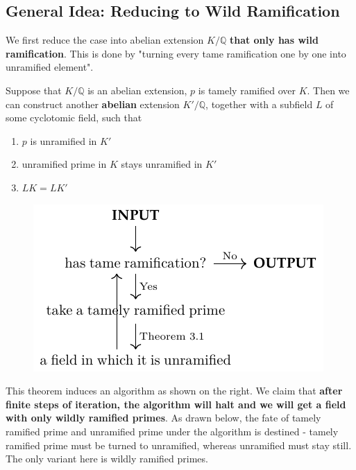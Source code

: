 \subsection{General Idea: Reducing to Wild Ramification}
    We first reduce the case into abelian extension $K/\mathbb{Q}$ \textbf{that only has wild ramification}. This is done by "turning every tame ramification one by one into unramified element".
    \begin{thm}
    \label{thm:thm-31}
    Suppose that $K/\mathbb{Q}$ is an abelian extension, $p$ is tamely ramified over $K$. Then we can construct another \textbf{abelian} extension $K'/\mathbb{Q}$, together with a subfield $L$ of some cyclotomic field, such that
    \begin{enumerate}
        \item $p$ is unramified in $K'$
        \item unramified prime in $K$ stays unramified in $K'$
        \item $LK=LK'$
    \end{enumerate}
    \end{thm}
    \begin{figure}
    \includegraphics[width=\linewidth]{Figures/figure4.pdf}
    \end{figure}
    \noindent
    This theorem induces an algorithm as shown on the right.
    We claim that \textbf{after finite steps of iteration, the algorithm will halt and we will get a field with only wildly ramified primes}. As drawn below, the fate of tamely ramified prime and unramified prime under the algorithm is destined - tamely ramified prime must be turned to unramified, whereas unramified must stay still. The only variant here is wildly ramified primes.
    \begin{center}
    \end{center}
